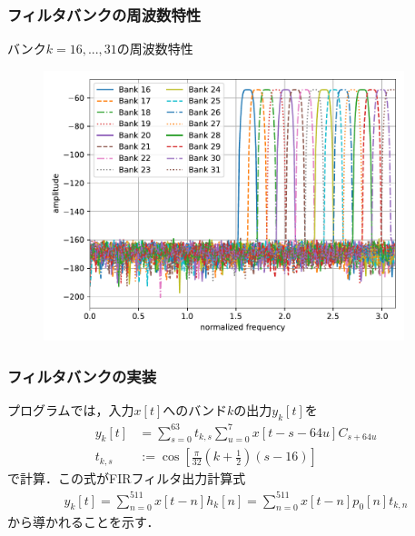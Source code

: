 \documentclass[14pt,xcolor=dvipsnames,table,dvipdfmx]{beamer}
\begin{document}
\begin{frame}[c]
    \frametitle{フィルタバンクの周波数特性}
    バンク$k = 16, ..., 31$の周波数特性
    \vspace{-5pt}
    \begin{figure}
        \includegraphics[width=105mm]{./figs/mp3_encoder_filter_bank_frequency_spec_16_31.pdf}
    \end{figure}
\end{frame}

\begin{frame}[c]
    \frametitle{フィルタバンクの実装}
    プログラムでは，入力$x[t]$へのバンド$k$の出力$y_{k}[t]$を
    \begin{align*}
        y_{k}[t] &= \sum_{s = 0}^{63} t_{k,s} \sum_{u = 0}^{7} x[t - s - 64u] C_{s + 64u} \\
        t_{k,s} &:= \cos\left[ \frac{\pi}{32}\left( k + \frac{1}{2} \right) \left( s - 16 \right) \right]
    \end{align*}
    で計算．この式がFIRフィルタ出力計算式
    \begin{align}
        y_{k}[t] = \sum_{n = 0}^{511} x[t - n] h_{k}[n] = \sum_{n = 0}^{511} x[t - n] p_{0}[n]  t_{k, n} \label{eq:cos_modulated_filter_fir_output}
    \end{align}
    から導かれることを示す．
\end{frame}
\end{document}
